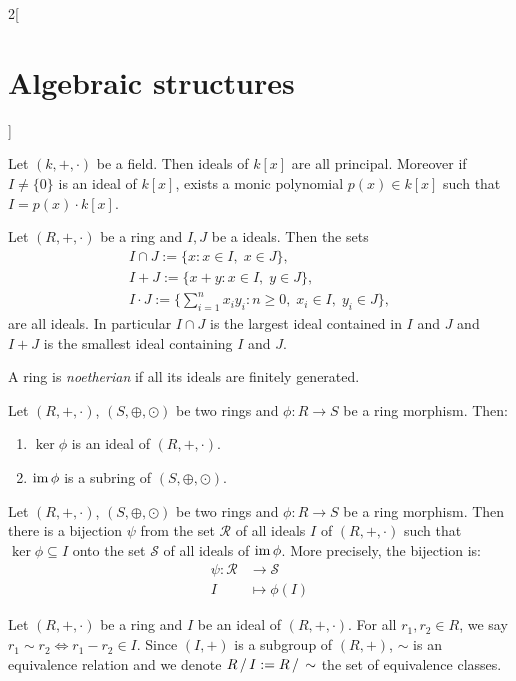 \documentclass[class=article,10pt,crop=false]{standalone}
\begin{document}
\begin{multicols}{2}[\section{Algebraic structures}]
\begin{lemma}
\end{lemma}
\begin{prop}
Let $(k,+,\cdot)$ be a field. Then ideals of $k[x]$ are all principal. Moreover if $I\ne\{0\}$ is an ideal of $k[x]$, exists a monic polynomial $p(x)\in k[x]$ such that $I=p(x)\cdot k[x]$.
\end{prop}
\begin{prop}
Let $(R,+,\cdot)$ be a ring and $I, J$ be a ideals. Then the sets
\begin{gather*}
    I\cap J:=\{x:x\in I,\;x\in J\},\\
    I+J:=\{x+y:x\in I,\;y\in J\},\\
    I\cdot J:=\{\sum_{i=1}^nx_iy_i:n\geq 0,\;x_i\in I,\;y_i\in J\},
\end{gather*}
are all ideals. In particular $I\cap J$ is the largest ideal contained in $I$ and $J$ and $I+J$ is the smallest ideal containing $I$ and $J$.
\end{prop}
\begin{definition}
A ring is \textit{noetherian} if all its ideals are finitely generated.
\end{definition}
\begin{lemma}
Let $(R,+,\cdot)$, $(S,\oplus,\odot)$ be two rings and $\phi:R\rightarrow S$ be a ring morphism. Then:
\begin{enumerate}
    \item $\ker\phi$ is an ideal of $(R,+,\cdot)$.
    \item $\operatorname{im}\phi$ is a subring of $(S,\oplus,\odot)$.
\end{enumerate}
\end{lemma}
\begin{theorem}
Let $(R,+,\cdot)$, $(S,\oplus,\odot)$ be two rings and $\phi:R\rightarrow S$ be a ring morphism. Then there is a bijection $\psi$ from the set $\mathcal{R}$ of all ideals $I$ of $(R,+,\cdot)$ such that $\ker\phi\subseteq I$ onto the set $\mathcal{S}$ of all ideals of $\operatorname{im}\phi$. More precisely, the bijection is:
\begin{align*}
    \psi:\mathcal{R}&\longrightarrow\mathcal{S}\\
    I&\longmapsto \phi(I)
\end{align*}
\end{theorem}
\begin{definition}
Let $(R,+,\cdot)$ be a ring and $I$ be an ideal of $(R,+,\cdot)$. For all $r_1,r_2\in R$, we say $r_1\sim r_2\iff r_1-r_2\in I$. Since $(I,+)$ is a subgroup of $(R,+)$, $\sim$ is an equivalence relation and we denote $\quot{R}{I}:=\quot{R}{\sim}$ the set of equivalence classes.

\end{definition}
\end{multicols}
\end{document}
